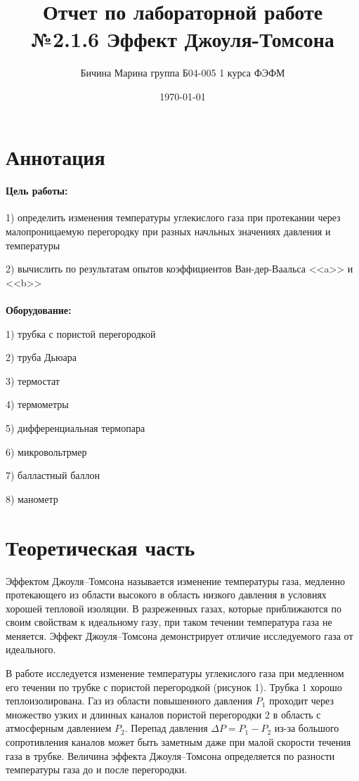 \documentclass[a4paper,12pt]{article} %
\author{Бичина Марина 
группа Б04-005 1 курса ФЭФМ}
\title{Отчет по лабораторной работе №2.1.6
Эффект Джоуля-Томсона}
\date{\today}
\begin{document}

\maketitle
\newpage


\section{Аннотация}

\paragraph{Цель работы:}

1) определить изменения температуры углекислого газа при протекании через малопроницаемую перегородку при разных начльных значениях давления и температуры

2) вычислить по результатам опытов коэффициентов Ван-дер-Ваальса <<a>> и <<b>> \\ \\ \textbf{Оборудование:}
 
1) трубка с пористой перегородкой

2) труба Дьюара

3) термостат

4) термометры

5) дифференциальная термопара

6) микровольтрмер

7) балластный баллон

8) манометр



\section{Теоретическая часть}


Эффектом Джоуля–Томсона называется изменение температуры
газа, медленно протекающего из области высокого в область низкого давления в условиях
хорошей тепловой изоляции.
В разреженных газах,
которые приближаются по своим свойствам
к идеальному газу, при таком течении температура газа не меняется. Эффект Джоуля–Томсона демонстрирует отличие исследуемого газа от идеального.

В работе исследуется изменение температуры углекислого газа
при медленном его течении по трубке с пористой перегородкой (рисунок 1). Трубка 1 хорошо теплоизолирована.
Газ из области повышенного давления $P_1$ проходит через множество узких и длинных каналов пористой перегородки 2 в область с атмосферным давлением
$P_2$. Перепад давления $\Delta P = P_1-P_2$ из-за большого сопротивления каналов может быть заметным даже при малой скорости течения газа в трубке. Величина эффекта Джоуля–Томсона определяется по
разности температуры газа до
и после перегородки.
\end{document}
